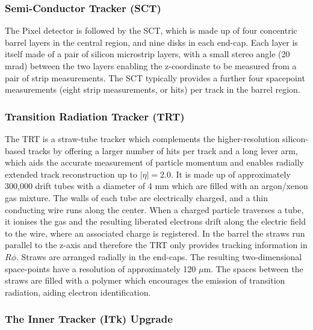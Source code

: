 \subsubsection{Semi-Conductor Tracker (SCT)}

The Pixel detector is followed by the SCT, which is made up of four concentric barrel layers in the central region, and nine disks in each end-cap. Each layer is itself made of a pair of silicon microstrip layers, with a small stereo angle (20 mrad) between the two layers enabling the z-coordinate to be measured from a pair of strip measurements. The SCT typically provides a further four spacepoint measurements (eight strip measurements, or hits) per track in the barrel region.


\subsubsection{Transition Radiation Tracker (TRT)}

The TRT is a straw-tube tracker which complements the higher-resolution silicon- based tracks by offering a larger number of hits per track and a long lever arm, which aids the accurate measurement of particle momentum and enables radially extended track reconstruction up to $ \lvert \eta \rvert = 2.0$. It is made up of approximately 300,000 drift tubes with a diameter of 4 mm which are filled with an argon/xenon gas mixture. The walls of each tube are electrically charged, and a thin conducting wire runs along the center. When a charged particle traverses a tube, it ionises the gas and the resulting liberated electrons drift along the electric field to the wire, where an associated charge is registered. In the barrel the straws run parallel to the z-axis and therefore the TRT only provides tracking information in $R\phi$. Straws are arranged radially in the end-caps. The resulting two-dimensional space-points have a resolution of approximately 120 $\mu$m. The spaces between the straws are filled with a polymer which encourages the emission of transition radiation, aiding electron identification.

\subsubsection{The Inner Tracker (ITk) Upgrade}

